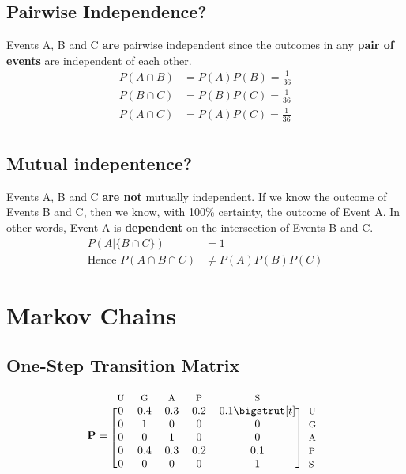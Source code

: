 \documentclass[12pt]{article}
\begin{document}
\subsection{Pairwise Independence?}

Events A, B and C \textbf{are} pairwise independent since the outcomes in any \textbf{pair of events} are independent of each other.
\begin{align*}
P(A\cap B) &= P(A)P(B) = \frac{1}{36}\\
P(B\cap C) &= P(B)P(C) = \frac{1}{36}\\
P(A\cap C) &= P(A)P(C) = \frac{1}{36}\\
\end{align*}

\subsection{Mutual indepentence?}

Events A, B and C \textbf{are not} mutually independent. If we know the outcome of Events B and C, then we know, with 100\% certainty, the outcome of Event A. In other words, Event A is \textbf{dependent} on the intersection of Events B and C.
\begin{align*}
	P(A|\{B\cap C\}) &= 1\\
	\text{Hence } P(A\cap B\cap C) &\neq P(A)P(B)P(C)
\end{align*}


\section{Markov Chains}

\subsection{One-Step Transition Matrix}
\begin{equation*}
	\mathbf{P}=
	\begin{blockarray}{*{5}{c} l}
	  \begin{block}{*{5}{>{$\footnotesize}c<{$}} l}
		U & G & A & P & S & \\
	  \end{block}
	  \begin{block}{[*{5}{c}]>{$\footnotesize}l<{$}}
		0 & 0.4 & 0.3 & 0.2 & 0.1 \bigstrut[t]& U \\
		0 & 1 & 0 & 0 & 0 & G \\
		0 & 0 & 1 & 0 & 0 & A \\
		0 & 0.4 & 0.3 & 0.2 & 0.1 & P \\
		0 & 0 & 0 & 0 & 1 & S \\
	  \end{block}
	\end{blockarray}
\end{equation*}
\end{document}
